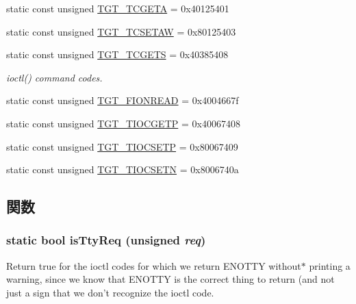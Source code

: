 \begin{Indent}{\bf }\par
{\em \label{_amgrpd41d8cd98f00b204e9800998ecf8427e}
 }\begin{DoxyCompactItemize}
\item 
static const unsigned \hyperlink{classSparcLinux_a804fc265279c5dbd78e0f95da998b267}{TGT\_\-TCGETA} = 0x40125401
\item 
static const unsigned \hyperlink{classSparcLinux_a96e06e042526ea5e89c4e8a020636c52}{TGT\_\-TCSETAW} = 0x80125403
\item 
static const unsigned \hyperlink{classSparcLinux_a50e5d880569ec2cb9a2f3d4aaa55cc64}{TGT\_\-TCGETS} = 0x40385408
\begin{DoxyCompactList}\small\item\em ioctl() command codes. \item\end{DoxyCompactList}\item 
static const unsigned \hyperlink{classSparcLinux_a1def346ff527c8efccfd52463f3b5dc1}{TGT\_\-FIONREAD} = 0x4004667f
\item 
static const unsigned \hyperlink{classSparcLinux_a90fcc56bd4aa74a5d86c87bfeae77625}{TGT\_\-TIOCGETP} = 0x40067408
\item 
static const unsigned \hyperlink{classSparcLinux_a194059e48b091a80833c40b500e70bec}{TGT\_\-TIOCSETP} = 0x80067409
\item 
static const unsigned \hyperlink{classSparcLinux_a6783bea53088dc89157c39a9a7c71988}{TGT\_\-TIOCSETN} = 0x8006740a
\end{DoxyCompactItemize}
\end{Indent}


\subsection{関数}
\hypertarget{classSparcLinux_ab20bdd4422ecf6e1736a5587be296b3f}{
\subsubsection[{isTtyReq}]{\setlength{\rightskip}{0pt plus 5cm}static bool isTtyReq (unsigned {\em req})}}
\label{classSparcLinux_ab20bdd4422ecf6e1736a5587be296b3f}
Return true for the ioctl codes for which we return ENOTTY without$\ast$ printing a warning, since we know that ENOTTY is the correct thing to return (and not just a sign that we don't recognize the ioctl code. 


